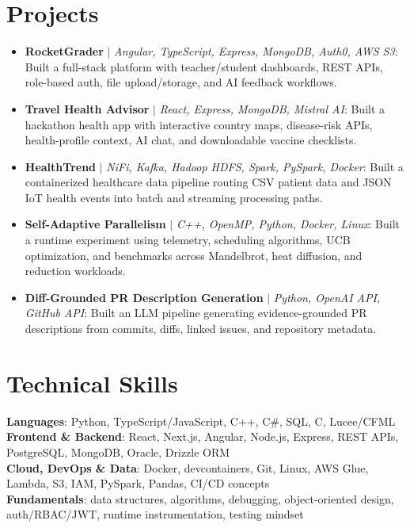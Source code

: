 \documentclass[letterpaper,11pt]{article}
\begin{document}
\section{Projects}
\begin{itemize}[leftmargin=0.15in, label={}, itemsep=-2pt, topsep=0pt, parsep=0pt]
  \item\small{\textbf{RocketGrader} $|$ \emph{Angular, TypeScript, Express, MongoDB, Auth0, AWS S3}: Built a full-stack platform with teacher/student dashboards, REST APIs, role-based auth, file upload/storage, and AI feedback workflows.}
  \item\small{\textbf{Travel Health Advisor} $|$ \emph{React, Express, MongoDB, Mistral AI}: Built a hackathon health app with interactive country maps, disease-risk APIs, health-profile context, AI chat, and downloadable vaccine checklists.}
  \item\small{\textbf{HealthTrend} $|$ \emph{NiFi, Kafka, Hadoop HDFS, Spark, PySpark, Docker}: Built a containerized healthcare data pipeline routing CSV patient data and JSON IoT health events into batch and streaming processing paths.}
  \item\small{\textbf{Self-Adaptive Parallelism} $|$ \emph{C++, OpenMP, Python, Docker, Linux}: Built a runtime experiment using telemetry, scheduling algorithms, UCB optimization, and benchmarks across Mandelbrot, heat diffusion, and reduction workloads.}
  \item\small{\textbf{Diff-Grounded PR Description Generation} $|$ \emph{Python, OpenAI API, GitHub API}: Built an LLM pipeline generating evidence-grounded PR descriptions from commits, diffs, linked issues, and repository metadata.}
\end{itemize}\vspace{-7pt}

\section{Technical Skills}
 \begin{itemize}[leftmargin=0.15in, label={}]
    \small{\item{
     \textbf{Languages}{: Python, TypeScript/JavaScript, C++, C\#, SQL, C, Lucee/CFML} \\
     \textbf{Frontend \& Backend}{: React, Next.js, Angular, Node.js, Express, REST APIs, PostgreSQL, MongoDB, Oracle, Drizzle ORM} \\
     \textbf{Cloud, DevOps \& Data}{: Docker, devcontainers, Git, Linux, AWS Glue, Lambda, S3, IAM, PySpark, Pandas, CI/CD concepts} \\
     \textbf{Fundamentals}{: data structures, algorithms, debugging, object-oriented design, auth/RBAC/JWT, runtime instrumentation, testing mindset}
    }}
 \end{itemize}
\end{document}
